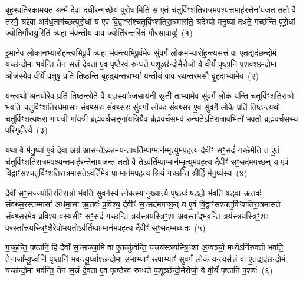 \setcounter{anuvakam}{0}
बृह॒स्पति॑रकामयत॒ श्रन्मे॑ दे॒वा दधी॑र॒न्गच्छे॑यं पुरो॒धामिति॒ स ए॒तं च॑तुर्विꣳशतिरा॒त्रम॑पश्य॒त्तमाह॑र॒त्तेना॑यजत॒ ततो॒ वै तस्मै॒ श्रद्दे॒वा अद॑ध॒ताग॑च्छत्पुरो॒धां य ए॒वं वि॒द्वाꣳस॑श्चतुर्विꣳशतिरा॒त्रमास॑ते॒ श्रदे᳚भ्यो मनु॒ष्या॑ दधते॒ गच्छ॑न्ति पुरो॒धां ज्योति॒र्गौरायु॒रिति॑ त्र्य॒हा भ॑वन्ती॒यं वाव ज्योति॑र॒न्तरि॑क्षं॒ गौर॒सावायुः॑~(१)

इ॒माने॒व लो॒कान॒भ्यारो॑हन्त्यभिपू॒र्वं त्र्य॒हा भ॑वन्त्यभिपू॒र्वमे॒व सु॑व॒र्गं लो॒कम॒भ्यारो॑ह॒न्त्यस॑त्त्रं॒ वा ए॒तद्यद॑छन्दो॒मं यच्छ॑न्दो॒मा भव॑न्ति॒ तेन॑ स॒त्त्रं दे॒वता॑ ए॒व पृ॒ष्ठैरव॑ रुन्धते प॒शूञ्छ॑न्दो॒मैरोजो॒ वै वी॒र्यं॑ पृ॒ष्ठानि॑ प॒शव॑श्छन्दो॒मा ओज॑स्ये॒व वी॒र्ये॑ प॒शुषु॒ प्रति॑ तिष्ठन्ति बृहद्रथन्त॒रा\-भ्यां᳚ यन्ती॒यं वाव र॑थन्त॒रम॒सौ बृ॒हदा॒भ्यामे॒व~(२)

य॒न्त्यथो॑ अ॒नयो॑रे॒व प्रति॑ तिष्ठन्त्ये॒ते वै य॒ज्ञस्या᳚ञ्ज॒साय॑नी स्रु॒ती ताभ्या॑मे॒व सु॑व॒र्गं लो॒कं य॑न्ति चतुर्विꣳशतिरा॒त्रो भ॑वति॒ चतु॑र्विꣳशतिरर्धमा॒साः सं॑वथ्स॒रः सं॑वथ्स॒रः सु॑व॒र्गो लो॒कः सं॑वथ्स॒र ए॒व सु॑व॒र्गे लो॒के प्रति॑ तिष्ठ॒न्त्यथो॒ चतु॑र्विꣳशत्यक्षरा गाय॒त्री गा॑य॒त्री ब्र॑ह्मवर्च॒सङ्गा॑यत्रि॒यैव ब्र॑ह्मवर्च॒समव॑ रुन्धते\-ऽतिरा॒त्राव॒भितो॑ भवतो ब्रह्मवर्च॒सस्य॒ परि॑गृहीत्यै~(३)

{\anuvakamend[{अ॒सावायु॑रा॒भ्यामे॒व पञ्च॑चत्वारिꣳशच्च}]}%

यथा॒ वै म॑नु॒ष्या॑ ए॒वं दे॒वा अग्र॑ आस॒न्ते॑\-ऽकामय॒न्ताव॑र्तिम्पा॒प्मान॑म्मृ॒त्युम॑प॒हत्य॒ दैवीꣳ॑ स॒ꣳ॒सदं॑ गच्छे॒मेति॒ त ए॒तं च॑तुर्विꣳशतिरा॒त्रम॑पश्य॒न्तमाह॑र॒न्तेना॑यजन्त॒ ततो॒ वै ते\-ऽव॑र्तिम्पा॒प्मान॑म्मृ॒त्युम॑प॒हत्य॒ दैवीꣳ॑ स॒ꣳ॒सद॑मगच्छ॒न् य ए॒वं वि॒द्वाꣳ॑सश्चतुर्विꣳशतिरा॒त्रमास॒ते\-ऽव॑र्तिमे॒व पा॒प्मान॑मप॒हत्य॒ श्रियं॑ गच्छन्ति॒ श्रीर्\mbox{}हि म॑नु॒ष्य॑स्य~(४)

दैवी॑ स॒ꣳ॒सज्ज्योति॑रतिरा॒त्रो भ॑वति सुव॒र्गस्य॑ लो॒कस्यानु॑ख्यात्यै॒ पृष्ठ्यः॑ षड॒हो भ॑वति॒ षड्वा ऋ॒तवः॑ संवथ्स॒रस्तम्मासा॑ अर्धमा॒सा ऋ॒तवः॑ प्र॒विश्य॒ दैवीꣳ॑ स॒ꣳ॒सद॑मगच्छ॒न् य ए॒वं वि॒द्वाꣳ॑सश्चतुर्विꣳशतिरा॒त्रमास॑ते संवथ्स॒रमे॒व प्र॒विश्य॒ वस्य॑सीꣳ स॒ꣳ॒सदं॑ गच्छन्ति॒ त्रय॑स्त्रयस्त्रि॒ꣳ॒शा अ॒वस्ता᳚द्भवन्ति॒ त्रय॑स्त्रयस्त्रि॒ꣳ॒शाः प॒रस्ता᳚त्त्रयस्त्रि॒ꣳ॒शैरे॒वोभ॒यतो\-ऽव॑र्तिम्पा॒प्मान॑मप॒हत्य॒ दैवीꣳ॑ स॒ꣳ॒सद॑म्मध्य॒तः~(५)

ग॒च्छ॒न्ति॒ पृ॒ष्ठानि॒ हि दैवी॑ स॒ꣳ॒सज्जा॒मि वा ए॒तत्कु॑र्वन्ति॒ यत्त्रय॑स्त्रयस्त्रि॒ꣳ॒शा अ॒न्वञ्चो॒ मध्ये\-ऽनि॑रुक्तो भवति॒ तेनाजा᳚म्यू॒र्ध्वानि॑ पृ॒ष्ठानि॑ भवन्त्यू॒र्ध्वाश्छ॑न्दो॒मा उ॒भाभ्याꣳ॑ रू॒पाभ्याꣳ॑ सुव॒र्गं लो॒कं य॒न्त्यस॑त्त्रं॒ वा ए॒तद्यद॑छन्दो॒मं यच्छ॑न्दो॒मा भव॑न्ति॒ तेन॑ स॒त्त्रं दे॒वता॑ ए॒व पृ॒त्ष्ठैरव॑ रुन्धते प॒शूञ्छ॑न्दो॒मैरोजो॒ वै वी॒र्यं॑ पृ॒ष्ठानि॑ प॒शवः॑~(६)

